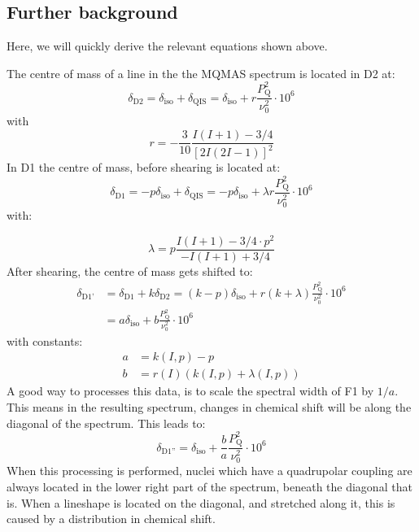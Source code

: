 \documentclass[11pt,a4paper]{article}
\begin{document}
 \subsection{Further background}
 Here, we will quickly derive the relevant equations shown above.

 The centre of mass of a line in the the MQMAS spectrum is located in D2 at:
 \begin{equation}
	\delta_\text{D2} = \delta_\text{iso} + \delta_\text{QIS}  =  \delta_\text{iso} + r
	\frac{P_\text{Q}^2}{\nu_0^2} \cdot 10^6
 \end{equation}
 with
 \begin{equation}
	r = -\frac{3}{10}\frac{I(I+1)-3/4}{[2I(2I-1)]^2}
 \end{equation}
 In D1 the centre of mass, before shearing is located at:
 \begin{equation}
	\delta_\text{D1} = -p\delta_\text{iso} + \delta_\text{QIS}  =  -p\delta_\text{iso} +
	\lambda r
	\frac{P_\text{Q}^2}{\nu_0^2} \cdot 10^6
 \end{equation}
 with:

 \begin{equation}
	\lambda = p \frac{I(I+1)-3/4 \cdot p^2}{-I(I+1)+3/4}
 \end{equation}
After shearing, the centre of mass gets shifted to:
 \begin{align}
	\delta_\text{D1'} &= \delta_\text{D1} + k\delta_\text{D2} = (k - p)\delta_\text{iso} +
	r	(k + \lambda) \frac{P_\text{Q}^2}{\nu_0^2} \cdot 10^6 \\
	& = a  \delta_\text{iso} + b \frac{P_\text{Q}^2}{\nu_0^2} \cdot 10^6
 \end{align}
 with constants:
 \begin{align}
	a & = k(I,p) - p \\
	b & = r(I)	(k(I,p) + \lambda(I,p))
 \end{align}
 A good way to processes this data, is to scale the spectral width of F1 by $1/a$.
 This means in the resulting spectrum, changes in chemical shift will be along the diagonal of the spectrum.
This leads to:
\begin{equation}
  \delta_\text{D1''} = \delta_\text{iso} + \frac{b}{a} \frac{P_\text{Q}^2}{\nu_0^2} \cdot 10^6
\end{equation}
When this processing is performed, nuclei which have a quadrupolar coupling are always located in the lower right part of the spectrum, beneath the diagonal that is.
When a lineshape is located on the diagonal, and stretched along it, this is caused by a distribution in chemical shift.
\end{document}
